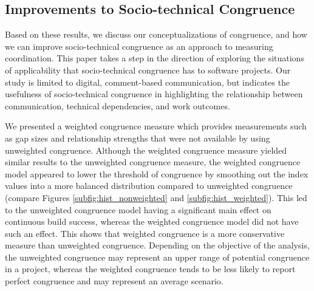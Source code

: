 \documentclass[12pt,oneside]{book}
\begin{document}

\subsection{Improvements to Socio-technical Congruence}
\label{sec:improvements}

Based on these results, we discuss our conceptualizations of congruence, and how we can improve socio-technical congruence as an approach to measuring coordination. This paper takes a step in the direction of exploring the situations of applicability that socio-technical congruence has to software projects. Our study is limited to digital, comment-based communication, but indicates the usefulness of socio-technical congruence in highlighting the relationship between communication, technical dependencies, and work outcomes.


We presented a weighted congruence measure which provides measurements such as gap sizes and relationship strengths that were not available by using unweighted congruence. Although the weighted congruence measure yielded similar results to the unweighted congruence measure, the weighted congruence model appeared to lower the threshold of congruence by smoothing out the index values into a more balanced distribution compared to unweighted congruence (compare Figures \ref{subfig:hist_nonweighted} and \ref{subfig:hist_weighted}).
This led to the unweighted congruence model having a significant main effect on continuous build success, whereas the weighted congruence model did not have such an effect.
This shows that weighted congruence is a more conservative
measure than unweighted congruence. Depending on the objective of the
analysis, the unweighted congruence may represent an upper range of
potential congruence in a project, whereas the weighted congruence
tends to be less likely to report perfect congruence and may represent an average scenario.
\end{document}
